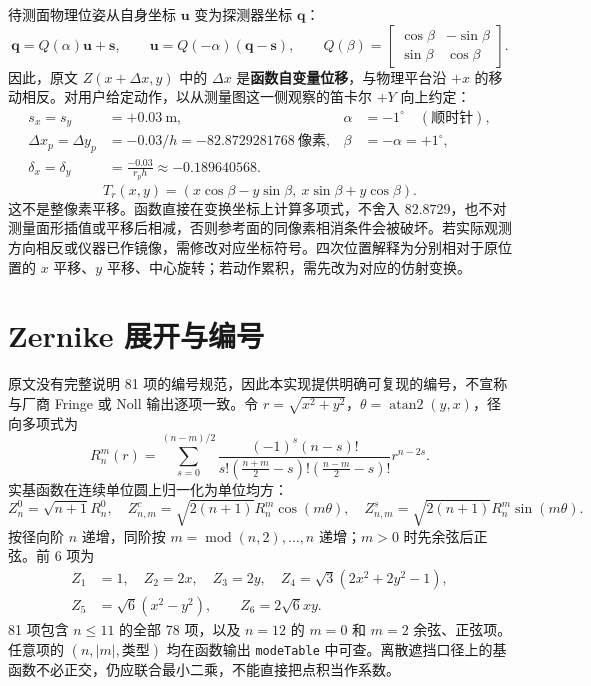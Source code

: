 \documentclass[UTF8,a4paper,zihao=-4]{ctexart}
\begin{document}
待测面物理位姿从自身坐标 $\bm u$ 变为探测器坐标 $\bm q$：
\begin{equation}
\bm q=Q(\alpha)\bm u+\bm s,\qquad
\bm u=Q(-\alpha)(\bm q-\bm s),\qquad
Q(\beta)=\begin{bmatrix}\cos\beta&-\sin\beta\\\sin\beta&\cos\beta\end{bmatrix}.
\end{equation}
因此，原文 $Z(x+\Delta x,y)$ 中的 $\Delta x$ 是\textbf{函数自变量位移}，与物理平台沿 $+x$ 的移动相反。对用户给定动作，以从测量图这一侧观察的笛卡尔 $+Y$ 向上约定：
\begin{align}
s_x=s_y&=+0.03\ \mathrm m,& \alpha&=-1^\circ\quad(\text{顺时针}),\\
\Delta x_p=\Delta y_p&=-0.03/h=-82.8729281768\ \text{像素},& \beta&=-\alpha=+1^\circ,\\
\delta_x=\delta_y&=\frac{-0.03}{r_ph}\approx-0.189640568.&&
\end{align}
\begin{equation}T_r(x,y)=(x\cos\beta-y\sin\beta,\ x\sin\beta+y\cos\beta).\end{equation}
这不是整像素平移。函数直接在变换坐标上计算多项式，不舍入 $82.8729$，也不对测量面形插值或平移后相减，否则参考面的同像素相消条件会被破坏。若实际观测方向相反或仪器已作镜像，需修改对应坐标符号。四次位置解释为分别相对于原位置的 $x$ 平移、$y$ 平移、中心旋转；若动作累积，需先改为对应的仿射变换。

\section{Zernike 展开与编号}
原文没有完整说明 81 项的编号规范，因此本实现提供明确可复现的编号，不宣称与厂商 Fringe 或 Noll 输出逐项一致。令 $r=\sqrt{x^2+y^2}$，$\theta=\operatorname{atan2}(y,x)$，径向多项式为
\begin{equation}
R_n^m(r)=\sum_{s=0}^{(n-m)/2}
\frac{(-1)^s(n-s)!}{s!\left(\frac{n+m}{2}-s\right)!\left(\frac{n-m}{2}-s\right)!}r^{n-2s}.
\end{equation}
实基函数在连续单位圆上归一化为单位均方：
\begin{equation}
Z_n^0=\sqrt{n+1}R_n^0,\quad
Z_{n,m}^{c}=\sqrt{2(n+1)}R_n^m\cos(m\theta),\quad
Z_{n,m}^{s}=\sqrt{2(n+1)}R_n^m\sin(m\theta).
\end{equation}
按径向阶 $n$ 递增，同阶按 $m=\operatorname{mod}(n,2),\ldots,n$ 递增；$m>0$ 时先余弦后正弦。前 6 项为
\begin{equation}
\begin{split}
Z_1&=1,\quad Z_2=2x,\quad Z_3=2y,\quad Z_4=\sqrt3(2x^2+2y^2-1),\\
Z_5&=\sqrt6(x^2-y^2),\qquad Z_6=2\sqrt6xy.
\end{split}
\end{equation}
81 项包含 $n\le11$ 的全部 78 项，以及 $n=12$ 的 $m=0$ 和 $m=2$ 余弦、正弦项。任意项的 $(n,|m|,\text{类型})$ 均在函数输出 \texttt{modeTable} 中可查。离散遮挡口径上的基函数不必正交，仍应联合最小二乘，不能直接把点积当作系数。
\end{document}
